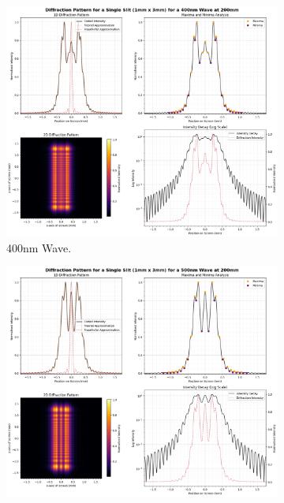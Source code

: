 \documentclass[12pt]{article}
\begin{document}
\begin{figure}[H]
    \centering
    \begin{subfigure}[b]{.48\textwidth}
        \centering
        \includegraphics[width=\linewidth]{vsslit_400nm.png}
        \caption{400nm Wave.}
        \label{fig:7a}
    \end{subfigure}
    \hspace{-.5em}
    \begin{subfigure}[b]{.48\textwidth}
        \centering
        \includegraphics[width=\linewidth]{vsslit_500nm.png}

\end{subfigure}
\end{figure}
\end{document}
